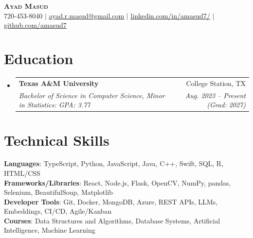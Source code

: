 \documentclass[letterpaper,10pt]{article}
\makeatletter
\newcommand{\resumeSubheading}[4]{
  \vspace{-2pt}\item
    \begin{tabular*}{0.97\textwidth}[t]{l@{\extracolsep{\fill}}r}
      \textbf{#1} & #2 \\
      \textit{\small#3} & \textit{\small #4} \\
    \end{tabular*}\vspace{-7pt}
}
\newcommand{\resumeSubHeadingListStart}{\begin{itemize}[leftmargin=0.15in, label={}, itemsep=-2pt]}
\newcommand{\resumeSubHeadingListEnd}{\end{itemize}}
\makeatother
\begin{document}

\begin{center}
    \textbf{\Huge \scshape Ayad Masud} \\ \vspace{1pt}
    \small 720-453-8040 $|$ \href{mailto:ayad.r.masud@gmail.com}{\underline{ayad.r.masud@gmail.com}} $|$ 
    \href{https://linkedin.com/in/amasud7}{\underline{linkedin.com/in/amasud7/}} $|$
    \href{https://github.com/amasud7}{\underline{github.com/amasud7}}
\end{center}


\section{Education}
  \resumeSubHeadingListStart
    \resumeSubheading
      {Texas A\&M University}{College Station, TX}
      {Bachelor of Science in Computer Science, Minor in Statistics: GPA: 3.77}{Aug. 2023 -- Present (Grad: 2027)}
  \resumeSubHeadingListEnd


\section{Technical Skills}
\begin{itemize}[leftmargin=0.15in, label={}]
   \small{\item{
    \textbf{Languages}{: TypeScript, Python, JavaScript, Java, C++, Swift, SQL, R, HTML/CSS} \\
    \textbf{Frameworks/Libraries}{: React, Node.js, Flask, OpenCV, NumPy, pandas, Selenium, BeautifulSoup, Matplotlib} \\
    \textbf{Developer Tools}{: Git, Docker, MongoDB, Azure, REST APIs, LLMs, Embeddings, CI/CD, Agile/Kanban} \\
    \textbf{Courses}{: Data Structures and Algorithms, Database Systems, Artificial Intelligence, Machine Learning}
   }}
\end{itemize}
\end{document}
